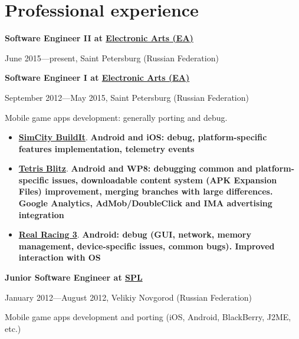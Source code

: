 \section{Professional experience}
{
\fontsize{12pt}{12pt}\selectfont
\bfseries Software Engineer II at
\href{http://www.ea.com}{Electronic Arts (EA)}
\mdseries
}

{
\fontsize{9pt}{8pt}\selectfont
June 2015---present, Saint Petersburg (Russian Federation)
}
\vspace{5pt}

{
\fontsize{12pt}{12pt}\selectfont
\bfseries Software Engineer I at
\href{http://www.ea.com}{Electronic Arts (EA)}
\mdseries
}

{
\fontsize{9pt}{8pt}\selectfont
September 2012---May 2015, Saint Petersburg (Russian Federation)
}

\subitem Mobile game apps development: generally porting and debug.
\begin{itemize}
\setlength{\itemindent}{20pt}
\item
    \href{http://www.ea.com/simcity-buildit}
        {\bfseries SimCity BuildIt\mdseries}.
        \bfseries Android \mdseries and \bfseries iOS\mdseries:
        debug,
        platform-specific features implementation,
        telemetry events
\item
    \href{http://www.tetrisblitz.com}
        {\bfseries Tetris Blitz\mdseries}.
        \bfseries Android \mdseries and \bfseries WP8\mdseries:
        debugging common and platform-specific issues,
        downloadable content system (APK Expansion Files) improvement,
        merging branches with large differences.
        Google Analytics, AdMob/DoubleClick and IMA advertising integration
\item
    \href{http://www.ea.com/real-racing-3}
    {\bfseries Real Racing 3\mdseries}.
        \bfseries Android\mdseries:
        debug (GUI, network, memory management, device-specific issues, common bugs).
        Improved interaction with OS
\end{itemize}

\vspace{5pt}

{
\fontsize{12pt}{12pt}\selectfont
\bfseries Junior Software Engineer at
\href{http://spl.co}{\bfseries SPL\mdseries}
\mdseries
}

{
\fontsize{9pt}{8pt}\selectfont
January 2012---August 2012, Velikiy Novgorod (Russian Federation)
}

Mobile game apps development and porting
(iOS, Android, BlackBerry, J2ME, etc.)

